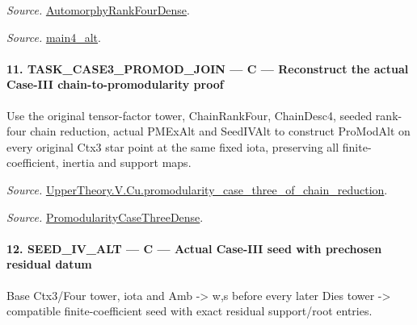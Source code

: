 \documentclass[11pt,a4paper]{article}
\numberwithin{equation}{section}
\theoremstyle{remark}\newtheorem{remark}[theorem]{Remark}
\begin{document}
\emph{Source.} \href{https://github.com/CocoSgt/riemann-hypothesis-lean/blob/7cbf7a0c32fca1badf05931879a37c3f8a2b03b4/src/Development/AutomorphicArithmetic/AutomorphicVarieties/ModularityArgument/ThresholdArguments/DenseThresholdCases/PromodularityCaseThree.lean#L43-L44}{AutomorphyRankFourDense}.

\emph{Source.} \href{https://github.com/CocoSgt/riemann-hypothesis-lean/blob/7cbf7a0c32fca1badf05931879a37c3f8a2b03b4/src/Development/AutomorphicArithmetic/AutomorphicVarieties/ModularityArgument/ThresholdArguments/DenseThresholdCases/CuFinal.lean#L44-L44}{main4\_\allowbreak alt}.



\paragraph{11. TASK\_\allowbreak CASE3\_\allowbreak PROMOD\_\allowbreak JOIN — C — Reconstruct the actual Case-III chain-to-promodularity proof}

Use the original tensor-factor tower, ChainRankFour, ChainDesc4, seeded rank-four chain reduction, actual PMExAlt and SeedIVAlt to construct ProModAlt on every original Ctx3 star point at the same fixed iota, preserving all finite-coefficient, inertia and support maps.

\emph{Source.} \href{https://github.com/CocoSgt/riemann-hypothesis-lean/blob/7cbf7a0c32fca1badf05931879a37c3f8a2b03b4/src/Development/AutomorphicArithmetic/AutomorphicVarieties/ModularityArgument/ThresholdArguments/DenseThresholdCases/PromodularityCaseThreeOfLemmas.lean#L131-L153}{UpperTheory.V.Cu.promodularity\_\allowbreak case\_\allowbreak three\_\allowbreak of\_\allowbreak chain\_\allowbreak reduction}.

\emph{Source.} \href{https://github.com/CocoSgt/riemann-hypothesis-lean/blob/7cbf7a0c32fca1badf05931879a37c3f8a2b03b4/src/Development/AutomorphicArithmetic/AutomorphicVarieties/ModularityArgument/ThresholdArguments/DenseThresholdCases/PromodularityCaseThree.lean#L40-L42}{PromodularityCaseThreeDense}.



\paragraph{12. SEED\_\allowbreak IV\_\allowbreak ALT — C — Actual Case-III seed with prechosen residual datum}

Base Ctx3/Four tower, iota and Amb -> w,s before every later Dies tower -> compatible finite-coefficient seed with exact residual support/root entries.
\end{document}

